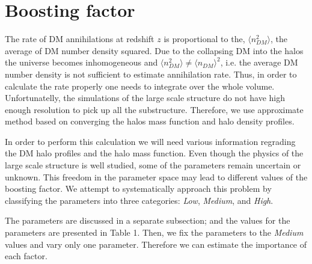 \section{Boosting factor}
\label{sec:boosting}

The rate of DM annihilations at redshift $z$ is proportional to the, $\langle n_{DM}^2 \rangle$, the average of DM number density squared. Due to the collapsing DM into the halos the universe becomes inhomogeneous and $\langle n_{DM}^2 \rangle \neq \langle n_{DM} \rangle ^2$, i.e. the average DM number density is not sufficient to estimate annihilation rate. Thus, in order to calculate the rate properly one needs to integrate over the whole volume. Unfortunatelly, the simulations of the large scale structure do not have high enough resolution to pick up all the substructure. Therefore, we use approximate method based on converging the halos mass function and halo density profiles.

In order to perform this calculation we will need various information regrading the DM halo profiles and the halo mass function. Even though the physics of the large scale structure is well studied, some of the parameters remain uncertain or unknown. This freedom in the parameter space may lead to different values of the boosting factor. We attempt to systematically approach this problem by classifying the parameters into three categories: \textit{Low}, \textit{Medium}, and \textit{High}. 

The parameters are discussed in a separate subsection; and the values for the parameters are presented in Table 1. Then, we fix the parameters to the \textit{Medium} values and vary only one parameter. Therefore we can estimate the importance of each factor.